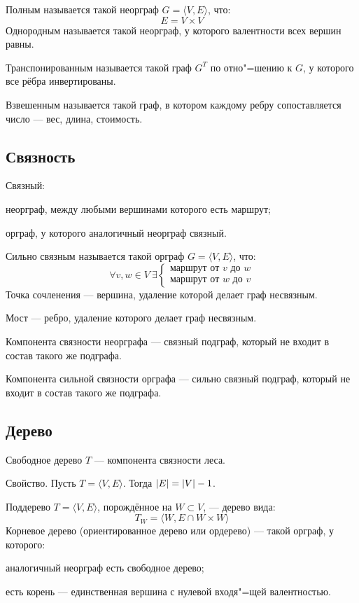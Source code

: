 {\bold Полным} называется такой неорграф $G=\langle V,E\rangle$, что:
$$E=V\times V$$
{\bold Однородным} называется такой неорграф, у которого {\ital валентности} всех вершин равны.

{\bold Транспонированным} называется такой граф $G^T$ по отно"=шению к $G$, у которого все рёбра {\ital инвертированы}.

{\bold Взвешенным} называется такой граф, в котором каждому ребру сопоставляется число --- {\ital вес, длина, стоимость}.

\subsection{Связность}

{\bold Связный:}
\begin{list*}
\item{\ital неорграф}, между любыми вершинами которого есть маршрут;
\item{\ital орграф}, у которого аналогичный неорграф {\ital связный}.
\end{list*}
{\bold Сильно связным} называется такой {\ital орграф} $G=\langle V,E\rangle$, что:
$$\forall v,w\in V\ \exists
\begin{cases}
\text{маршрут от }v\text{ до }w\\
\text{маршрут от }w\text{ до }v
\end{cases}$$
{\bold Точка сочленения} --- вершина, удаление которой делает граф {\ital несвязным}.

{\bold Мост} --- ребро, удаление которого делает граф {\ital несвязным}.

{\bold Компонента связности} {\ital неорграфа} --- связный подграф, который не входит в состав такого же подграфа.

{\bold Компонента сильной связности} {\ital орграфа} --- сильно связный подграф, который не входит в состав такого же подграфа.

\subsection{Дерево}

{\bold Свободное дерево} $T$ --- компонента связности леса.
\begin{theorem}
{\bold Свойство.} Пусть $T=\langle V,E\rangle$. Тогда $\left|E\right|=\left|V\right|-1$.
\end{theorem}
{\bold Поддерево} $T=\langle V,E\rangle$, {\ital порождённое} на $W\subset V$, --- дерево вида:
$$T_W=\langle W,E\cap W\times W\rangle$$
{\bold Корневое дерево} {\ital (ориентированное дерево или ордерево)} --- такой орграф, у которого:
\begin{list*}
\item аналогичный неорграф есть свободное дерево;
\item есть {\bold корень} --- единственная вершина с нулевой входя"=щей валентностью.
\end{list*}

